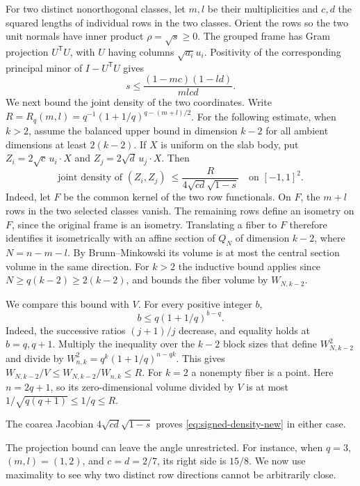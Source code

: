 \documentclass[11pt,a4paper]{article}
\theoremstyle{remark}\newtheorem{remark}[theorem]{Remark}
\numberwithin{equation}{section}
\begin{document}
For two distinct nonorthogonal classes, let \(m,l\) be their multiplicities and \(c,d\) the
squared lengths of individual rows in the two classes. Orient the rows so the two unit normals
have inner product \(\rho=\sqrt{s}\ge0\).
The grouped frame has Gram projection \(U^{\mathsf T}U\), with
\(U\) having columns \(\sqrt{a_i}u_i\). Positivity of the
corresponding principal minor of \(I-U^{\mathsf T}U\) gives
\begin{equation}\label{eq:complementary-angle}
 s\le\frac{(1-mc)(1-ld)}{mlcd}.
\end{equation}
We next bound the joint density of the two coordinates. Write
\(R=R_q(m,l)=q^{-1}(1+1/q)^{q-(m+l)/2}\).
For the following estimate, when \(k>2\), assume the balanced upper
bound in dimension \(k-2\) for all ambient dimensions at least \(2(k-2)\).
If \(X\) is uniform on the slab body, put
\(Z_i=2\sqrt c\,u_i\cdot X\) and \(Z_j=2\sqrt d\,u_j\cdot X\).
Then
\begin{equation}\label{eq:signed-density-new}
 \text{joint density of }(Z_i,Z_j)\ \le
   \frac{R}{4\sqrt{cd}\sqrt{1-s}}\quad\text{on }[-1,1]^2 .
\end{equation}
Indeed, let \(F\) be the common kernel of the two row functionals.
On \(F\), the \(m+l\) rows in the two selected classes vanish. The remaining
rows define an isometry on \(F\), since the original frame is an
isometry. Translating a fiber to \(F\) therefore identifies it
isometrically with an affine section of \(Q_N\) of dimension \(k-2\),
where \(N=n-m-l\). By Brunn--Minkowski its volume is at most the
central section volume in the same direction. For \(k>2\) the
inductive bound applies since \(N\ge q(k-2)\ge2(k-2)\), and bounds
the fiber volume by \(W_{N,k-2}\).

We compare this bound with \(V\). For every positive integer \(b\),
\[
 b\le q(1+1/q)^{b-q}.
\]
Indeed, the successive ratios \((j+1)/j\) decrease, and equality
holds at \(b=q,q+1\). Multiply the inequality over the \(k-2\) block
sizes that define \(W_{N,k-2}^2\) and divide by
\(W_{n,k}^2=q^k(1+1/q)^{n-qk}\). This gives
\(W_{N,k-2}/V\le W_{N,k-2}/W_{n,k}\le R\).
For \(k=2\) a nonempty fiber is a point. Here \(n=2q+1\), so its
zero-dimensional volume divided by \(V\) is at most
\(1/\sqrt{q(q+1)}\le1/q\le R\).

The coarea Jacobian \(4\sqrt{cd}\sqrt{1-s}\) proves
\eqref{eq:signed-density-new} in either case.

The projection bound can leave the angle unrestricted. For instance,
when \(q=3\), \((m,l)=(1,2)\), and \(c=d=2/7\), its right side
is \(15/8\). We now use maximality to see why two distinct row
directions cannot be arbitrarily close.
\end{document}
